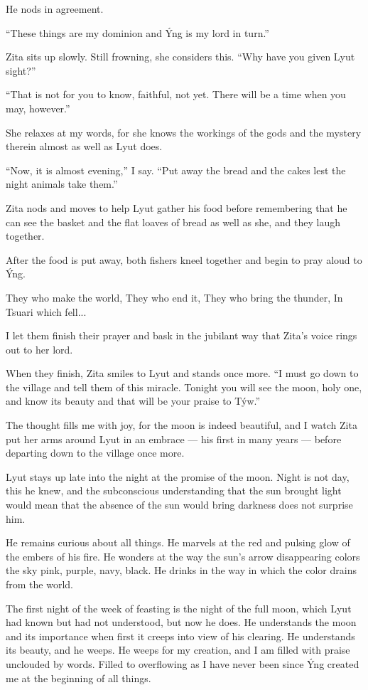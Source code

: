 He nods in agreement.

``These things are my dominion and Ýng is my lord in turn.''

Zita sits up slowly. Still frowning, she considers this. ``Why have you given Lyut sight?''

``That is not for you to know, faithful, not yet. There will be a time when you may, however.''

She relaxes at my words, for she knows the workings of the gods and the mystery therein almost as well as Lyut does.

``Now, it is almost evening,'' I say. ``Put away the bread and the cakes lest the night animals take them.''

Zita nods and moves to help Lyut gather his food before remembering that he can see the basket and the flat loaves of bread as well as she, and they laugh together.

After the food is put away, both fishers kneel together and begin to pray aloud to Ýng.

They who make the world, They who end it, They who bring the thunder, In Tsuari which fell...

I let them finish their prayer and bask in the jubilant way that Zita's voice rings out to her lord.

When they finish, Zita smiles to Lyut and stands once more. ``I must go down to the village and tell them of this miracle. Tonight you will see the moon, holy one, and know its beauty and that will be your praise to Týw.''

The thought fills me with joy, for the moon is indeed beautiful, and I watch Zita put her arms around Lyut in an embrace --- his first in many years --- before departing down to the village once more.

Lyut stays up late into the night at the promise of the moon. Night is not day, this he knew, and the subconscious understanding that the sun brought light would mean that the absence of the sun would bring darkness does not surprise him.

He remains curious about all things. He marvels at the red and pulsing glow of the embers of his fire. He wonders at the way the sun's arrow disappearing colors the sky pink, purple, navy, black. He drinks in the way in which the color drains from the world.

The first night of the week of feasting is the night of the full moon, which Lyut had known but had not understood, but now he does. He understands the moon and its importance when first it creeps into view of his clearing. He understands its beauty, and he weeps. He weeps for my creation, and I am filled with praise unclouded by words. Filled to overflowing as I have never been since Ýng created me at the beginning of all things.

